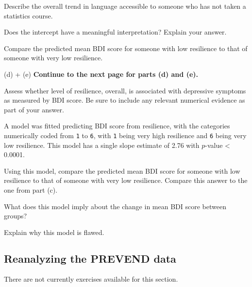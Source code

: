 {\begin{parts}
		\item Describe the overall trend in language accessible to someone who has not taken a statistics course. 
		
		\item Does the intercept have a meaningful interpretation? Explain your answer.
		
		\item Compare the predicted mean BDI score for someone with low resilience to that of someone with very low resilience.

		\item[(d) + (e)] \textbf{Continue to the next page for parts (d) and (e).}
		
\textD{\newpage}

		\item Assess whether level of resilience, overall, is associated with depressive symptoms as measured by BDI score. Be sure to include any relevant numerical evidence as part of your answer.
		
		\item A model was fitted predicting BDI score from resilience, with the categories numerically coded from \texttt{1} to \texttt{6}, with \texttt{1} being very high resilience and \texttt{6} being very low resilience. This model has a single slope estimate of 2.76 with $p$-value < 0.0001. 
		
		\begin{subparts}
			\item Using this model, compare the predicted mean BDI score for someone with low resilience to that of someone with very low resilience. Compare this answer to the one from part (c).
			
			\item What does this model imply about the change in mean BDI score between groups?
			
			\item Explain why this model is flawed.
			
		\end{subparts}
	\end{parts}
}{}



\subsection{Reanalyzing the PREVEND data}

\noindent%
There are not currently exercises available for this section.


